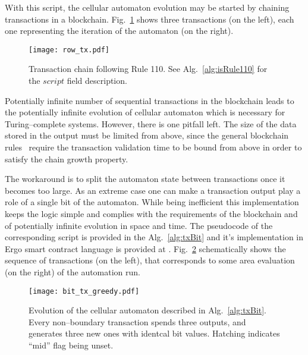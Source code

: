 \documentclass[runningheads]{llncs}
\begin{document}
    With this script, the cellular automaton evolution may be started by
    chaining transactions in a blockchain. Fig.~\ref{fig:txs} shows three
    transactions (on the left), each one representing the iteration of the
    automaton (on the right).

    \begin{figure}[h]
        \centering
        \texttt{[image: row\_tx.pdf]}
        \caption{Transaction chain following Rule 110. See
            Alg.~\ref{alg:isRule110} for the
            $script$ field description.
        \label{fig:txs} }
    \end{figure}
    Potentially infinite number of sequential transactions in the blockchain
    leads to the potentially infinite evolution of cellular automaton which is
    necessary for Turing--complete systems.  However, there is one pitfall left.
    The size of the data stored in the output must be limited from above, since
    the general blockchain rules~\cite{garay2015bitcoin} require the transaction
    validation time to be bound from above in order to satisfy the chain growth
    property.

    The workaround is to split the automaton state between
    transactions once it becomes too large. As an extreme case one can make a
    transaction output play a role of a single bit of the automaton. While being
    inefficient this implementation keeps the logic simple and complies with the
    requirements of the blockchain and of potentially infinite evolution in
    space and time. The pseudocode of the corresponding script is
    provided in the Alg.~\ref{alg:txBit} and it's implementation in Ergo smart
    contract language is provided at \cite{ergoScript2}. Fig.~\ref{fig:bit_txs}
    schematically shows the sequence of transactions (on the left), that corresponds
    to some area evaluation (on the right) of the automation run.
    \begin{figure}[h]
        \centering
        \texttt{[image: bit\_tx\_greedy.pdf]}
        \caption{Evolution of the cellular automaton described in
            Alg.~\ref{alg:txBit}. Every non--boundary transaction spends three
            outputs, and generates three new ones with identcal bit values.
            Hatching indicates ``mid'' flag being unset.
        \label{fig:bit_txs} }
    \end{figure}
    
\end{document}
